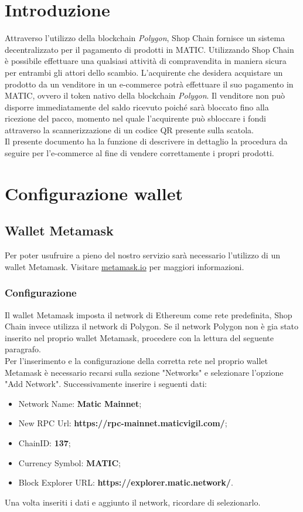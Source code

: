 \documentclass[a4paper, 12pt]{article}
\begin{document}
\makefrontpage
\makeversioni
\tableofcontents
\newpage

\section{Introduzione}
Attraverso l'utilizzo della blockchain \textit{Polygon}, Shop Chain fornisce un sistema decentralizzato per il pagamento di prodotti in MATIC. Utilizzando Shop Chain è possibile effettuare una qualsiasi attività di compravendita in maniera sicura per entrambi gli attori dello scambio. L'acquirente che desidera acquistare un prodotto da un venditore in un e-commerce potrà effettuare il suo pagamento in MATIC, ovvero il token nativo della blockchain \textit{Polygon}. Il venditore non può disporre immediatamente del saldo ricevuto poiché sarà bloccato fino alla ricezione del pacco, momento nel quale l'acquirente può sbloccare i fondi attraverso la scannerizzazione di un codice QR presente sulla scatola.
\\Il presente documento ha la funzione di descrivere in dettaglio la procedura da seguire per l'e-commerce al fine di vendere correttamente i propri prodotti.

\newpage
\section{Configurazione wallet}
\subsection{Wallet Metamask}
Per poter usufruire a pieno del nostro servizio sarà necessario l'utilizzo di un wallet Metamask. Visitare \href{https://www.metamask.io}{metamask.io} per maggiori informazioni.
\subsubsection{Configurazione}
Il wallet Metamask imposta il network di Ethereum come rete predefinita, Shop Chain invece utilizza il network di Polygon. Se il network Polygon non è gia stato inserito nel proprio wallet Metamask, procedere con la lettura del seguente paragrafo.
\\Per l'inserimento e la configurazione della corretta rete nel proprio wallet Metamask è necessario recarsi sulla sezione "Networks" e selezionare l'opzione "Add Network". Successivamente inserire i seguenti dati:
\begin{itemize}
\item Network Name: \textbf{Matic Mainnet};
\item New RPC Url: \textbf{https://rpc-mainnet.maticvigil.com/};
\item ChainID: \textbf{137};
\item Currency Symbol: \textbf{MATIC};
\item Block Explorer URL: \textbf{https://explorer.matic.network/}.
\end{itemize}
Una volta inseriti i dati e aggiunto il network, ricordare di selezionarlo.
\end{document}
